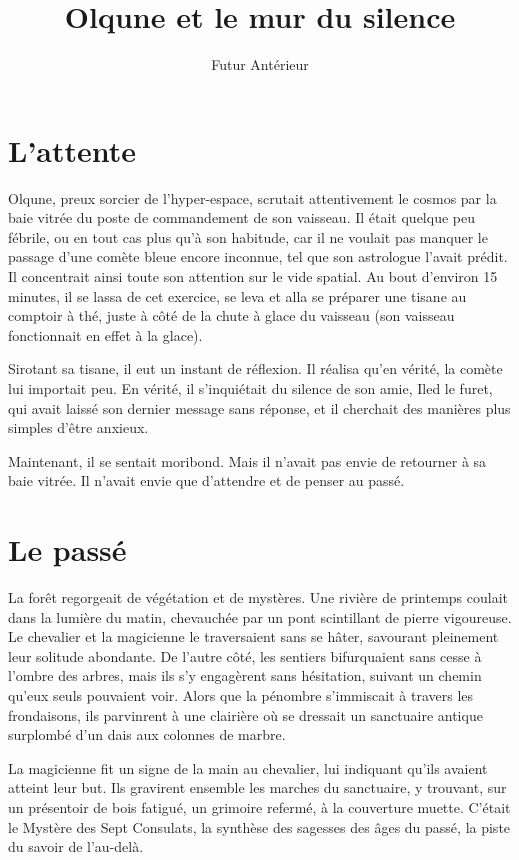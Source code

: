 \documentclass[a4paper,11pt, openany]{book}
\title{Olqune et le mur du silence}
\author{Futur Antérieur}
\begin{document}
\maketitle

\chapter{L'attente}
Olqune, preux sorcier de l'hyper-espace, scrutait attentivement le cosmos par la baie vitrée du poste de commandement de son vaisseau.
Il était quelque peu fébrile, ou en tout cas plus qu'à son habitude, car il ne voulait pas manquer le passage d'une comète bleue encore inconnue, tel que son astrologue l'avait prédit.
Il concentrait ainsi toute son attention sur le vide spatial. Au bout d'environ 15 minutes, il se lassa de cet exercice, se leva 
et alla se préparer une tisane au comptoir à thé, juste à côté de la chute à glace du vaisseau (son vaisseau fonctionnait en effet à la glace).

Sirotant sa tisane, il eut un instant de réflexion. Il réalisa qu'en vérité, la comète lui importait peu.
En vérité, il s'inquiétait du silence de son amie, Iled le furet, qui avait laissé son dernier message sans réponse, et il cherchait des manières plus simples d'être anxieux.

Maintenant, il se sentait moribond. Mais il n'avait pas envie de retourner à sa baie vitrée. Il n'avait envie que d'attendre et de penser au passé.

\chapter{Le passé}
La forêt regorgeait de végétation et de mystères. Une rivière de printemps coulait dans la lumière du matin, chevauchée par un pont scintillant de pierre vigoureuse.
Le chevalier et la magicienne le traversaient sans se hâter, savourant pleinement leur solitude abondante. 
De l'autre côté, les sentiers bifurquaient sans cesse à l'ombre des arbres, mais ils s'y engagèrent sans hésitation, suivant un chemin qu'eux seuls pouvaient voir.
Alors que la pénombre s'immiscait à travers les frondaisons, ils parvinrent à une clairière où se dressait un sanctuaire antique surplombé d'un dais aux colonnes de marbre. 

La magicienne fit un signe de la main au chevalier, lui indiquant qu'ils avaient atteint leur but. 
Ils gravirent ensemble les marches du sanctuaire, y trouvant, sur un présentoir de bois fatigué, un grimoire refermé, à la couverture muette.
C'était le Mystère des Sept Consulats, la synthèse des sagesses des âges du passé, la piste du savoir de l'au-delà.
\end{document}
